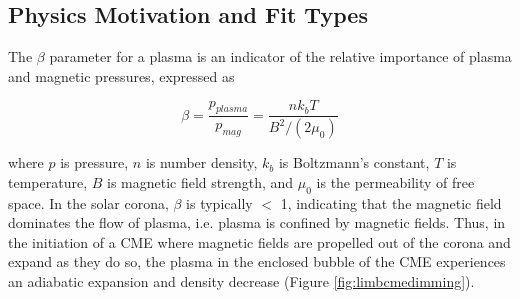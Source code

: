 \subsection{Physics Motivation and Fit Types}
The $\beta$ parameter for a plasma is an indicator of the relative importance of plasma and magnetic pressures, expressed as 

\begin{equation*}
    \beta = \frac{p_{plasma}}{p_{mag}} = \frac{nk_bT}{B^2/(2\mu _0)}
\end{equation*}

\noindent where $p$ is pressure, $n$ is number density, $k_b$ is Boltzmann's constant, $T$ is temperature, $B$ is magnetic field strength, and $\mu _0$ is the permeability of free space. In the solar corona, $\beta$ is typically $<$ 1, indicating that the magnetic field dominates the flow of plasma, i.e. plasma is confined by magnetic fields. Thus, in the initiation of a CME where magnetic fields are propelled out of the corona and expand as they do so, the plasma in the enclosed bubble of the CME experiences an adiabatic expansion and density decrease (Figure \ref{fig:limbcmedimming}). 


